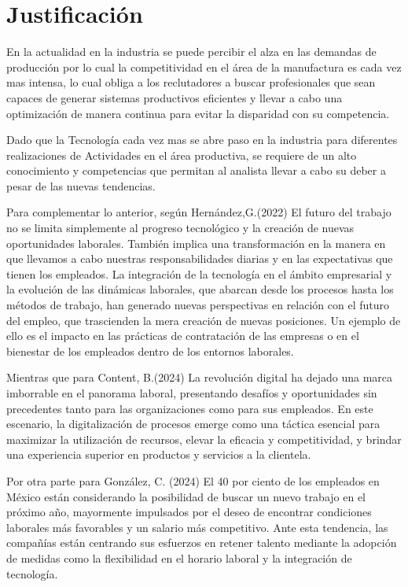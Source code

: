     \section{Justificación}
    En la actualidad en la industria se puede percibir el alza en las demandas de producción por lo cual la competitividad en el área de la manufactura es cada vez mas intensa, lo cual obliga a los reclutadores a buscar profesionales que sean capaces de generar sistemas productivos eficientes y llevar a cabo una optimización de manera continua para evitar la disparidad con su competencia.
    
    Dado que la Tecnología cada vez mas se abre paso en la industria para diferentes realizaciones de Actividades en el área productiva, se requiere de un alto conocimiento y competencias que permitan al analista 
    llevar a cabo su deber a pesar de las nuevas tendencias.
    
    Para complementar lo anterior, según Hernández,G.(2022) El futuro del trabajo no se limita simplemente al progreso tecnológico y la creación de nuevas oportunidades laborales. También implica una transformación en la manera en que llevamos a cabo nuestras responsabilidades diarias y en las expectativas que tienen los empleados. La integración de la tecnología en el ámbito empresarial y la evolución de las dinámicas laborales, que abarcan desde los procesos hasta los métodos de trabajo, han generado nuevas perspectivas en relación con el futuro del empleo, que trascienden la mera creación de nuevas posiciones. Un ejemplo de ello es el impacto en las prácticas de contratación de las empresas o en el bienestar de los empleados dentro de los entornos laborales.\cite{REF4}
    
    Mientras que para Content, B.(2024) La revolución digital ha dejado una marca imborrable en el panorama laboral, presentando desafíos y oportunidades sin precedentes tanto para las organizaciones como para sus empleados. En este escenario, la digitalización de procesos emerge como una táctica esencial para maximizar la utilización de recursos, elevar la eficacia y competitividad, y brindar una experiencia superior en productos y servicios a la clientela.
    
    Por otra parte para González, C. (2024)
    El 40 por ciento de los empleados en México están considerando la posibilidad de buscar un nuevo trabajo en el próximo año, mayormente impulsados por el deseo de encontrar condiciones laborales más favorables y un salario más competitivo. Ante esta tendencia, las compañías están centrando sus esfuerzos en retener talento mediante la adopción de medidas como la flexibilidad en el horario laboral y la integración de tecnología.\cite{REF5}
